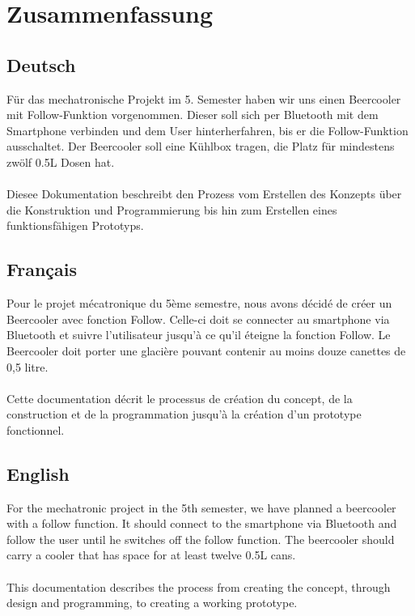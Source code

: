 \section*{Zusammenfassung}

\subsection*{Deutsch}

Für das mechatronische Projekt im 5. Semester haben wir uns einen Beercooler mit Follow-Funktion vorgenommen. Dieser soll sich per Bluetooth mit dem Smartphone verbinden und dem User hinterherfahren, bis er die Follow-Funktion ausschaltet. Der Beercooler soll eine Kühlbox tragen, die Platz für mindestens zwölf 0.5L Dosen hat.
\\ \\
Diesee Dokumentation beschreibt den Prozess vom Erstellen des Konzepts über die Konstruktion und Programmierung bis hin zum Erstellen eines funktionsfähigen Prototyps.

\subsection*{Français}

Pour le projet mécatronique du 5ème semestre, nous avons décidé de créer un Beercooler avec fonction Follow. Celle-ci doit se connecter au smartphone via Bluetooth et suivre l'utilisateur jusqu'à ce qu'il éteigne la fonction Follow. Le Beercooler doit porter une glacière pouvant contenir au moins douze canettes de 0,5 litre.
\\ \\
Cette documentation décrit le processus de création du concept, de la construction et de la programmation jusqu'à la création d'un prototype fonctionnel.

\subsection*{English}

For the mechatronic project in the 5th semester, we have planned a beercooler with a follow function. It should connect to the smartphone via Bluetooth and follow the user until he switches off the follow function. The beercooler should carry a cooler that has space for at least twelve 0.5L cans.
\\ \\
This documentation describes the process from creating the concept, through design and programming, to creating a working prototype.
